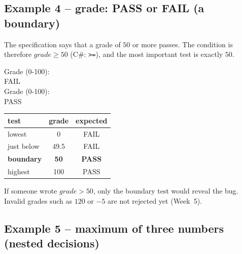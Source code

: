 \documentclass[11pt,a4paper]{article}
\begin{document}
\subsection{Example 4 -- grade: PASS or FAIL (a boundary)}
The specification says that a grade of $50$ or more passes. The condition is therefore $grade \ge 50$ (C\#: \texttt{>=}), and the most important test is exactly $50$.
\begin{center}
\begin{minipage}[c]{0.42\linewidth}\centering
{}
\end{minipage}\hfill
\begin{minipage}[c]{0.54\linewidth}
\begin{consolebox}
Grade (0-100): \\ FAIL\\
Grade (0-100): \\ PASS
\end{consolebox}
\centering\small
\begin{tabular}{lcc}
\toprule
test & grade & expected\\ \midrule
lowest & 0 & FAIL\\
just below & 49.5 & FAIL\\
\textbf{boundary} & \textbf{50} & \textbf{PASS}\\
highest & 100 & PASS\\ \bottomrule
\end{tabular}
\end{minipage}
\end{center}
If someone wrote $grade > 50$, only the boundary test would reveal the bug. Invalid grades such as $120$ or $-5$ are not rejected yet (Week~5).

\subsection{Example 5 -- maximum of three numbers (nested decisions)}
\end{document}
